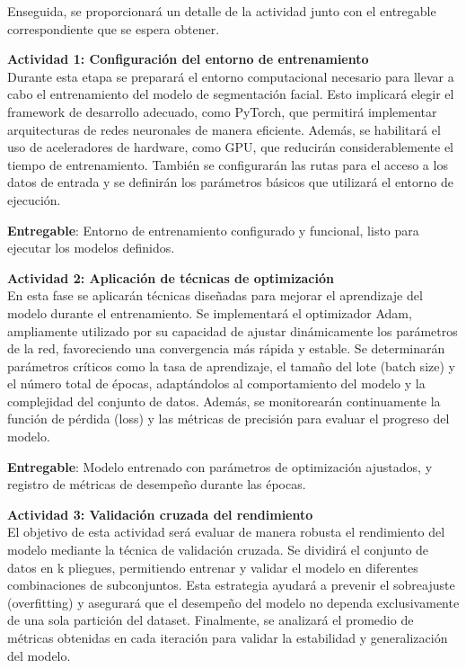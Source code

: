 Enseguida, se proporcionará un detalle de la actividad junto con el entregable correspondiente que se espera obtener.
 
 \textbf{Actividad 1: Configuración del entorno de entrenamiento}
 \\
 Durante esta etapa se preparará el entorno computacional necesario para llevar a cabo el entrenamiento del modelo de segmentación facial. Esto implicará elegir el framework de desarrollo adecuado, como PyTorch, que permitirá implementar arquitecturas de redes neuronales de manera eficiente. Además, se habilitará el uso de aceleradores de hardware, como GPU, que reducirán considerablemente el tiempo de entrenamiento. También se configurarán las rutas para el acceso a los datos de entrada y se definirán los parámetros básicos que utilizará el entorno de ejecución.

 \textbf{Entregable}: Entorno de entrenamiento configurado y funcional, listo para ejecutar los modelos definidos.

 \textbf{Actividad 2: Aplicación de técnicas de optimización}
 \\
 En esta fase se aplicarán técnicas diseñadas para mejorar el aprendizaje del modelo durante el entrenamiento. Se implementará el optimizador Adam, ampliamente utilizado por su capacidad de ajustar dinámicamente los parámetros de la red, favoreciendo una convergencia más rápida y estable. Se determinarán parámetros críticos como la tasa de aprendizaje, el tamaño del lote (batch size) y el número total de épocas, adaptándolos al comportamiento del modelo y la complejidad del conjunto de datos. Además, se monitorearán continuamente la función de pérdida (loss) y las métricas de precisión para evaluar el progreso del modelo.

 \textbf{Entregable}: Modelo entrenado con parámetros de optimización ajustados, y registro de métricas de desempeño durante las épocas.

 \textbf{Actividad 3: Validación cruzada del rendimiento}
 \\
 El objetivo de esta actividad será evaluar de manera robusta el rendimiento del modelo mediante la técnica de validación cruzada. Se dividirá el conjunto de datos en k pliegues, permitiendo entrenar y validar el modelo en diferentes combinaciones de subconjuntos. Esta estrategia ayudará a prevenir el sobreajuste (overfitting) y asegurará que el desempeño del modelo no dependa exclusivamente de una sola partición del dataset. Finalmente, se analizará el promedio de métricas obtenidas en cada iteración para validar la estabilidad y generalización del modelo.

